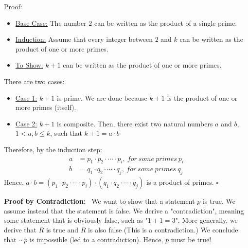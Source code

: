 \documentclass[letterpaper]{article}
\begin{document}
    \underline{Proof}:
    \begin{itemize}
        \item[] \underline{Base Case:} The number $2$ can be written as the product of a single prime.
        \item[] \underline{Induction:} Assume that every integer between $2$ and $k$ can be written as the product of one or more primes.
        \item[] \underline{To Show:} $k+1$ can be written as the product of one or more primes.
    \end{itemize}
    There are two cases:
    \begin{itemize}
        \item[] \underline{Case 1:} $k+1$ is prime. We are done because $k+1$ is the product of one or more primes (itself).
        \item[] \underline{Case 2:} $k+1$ is composite. Then, there exist two natural numbers $a$ and $b$, $1<a, b \le k$, such that $k+1 = a \cdot b$
    \end{itemize}
    Therefore, by the induction step:
    \begin{align*}
        a &= p_1 \cdot p_2 \cdot \dotsb \cdot p_i,\ for\ some\ primes\ p_i\\
        b &= q_1 \cdot q_2 \cdot \dotsb \cdot q_j,\ for\ some\ primes\ q_j
    \end{align*}
Hence, $a\cdot b = (p_1 \cdot p_2 \cdot \dotsb \cdot p_i)\cdot (q_1 \cdot q_2 \cdot \dotsb \cdot q_j)$ is a product of primes. $\square$
\setlength{\parskip}{.3in}



\noindent \textbf{Proof by Contradiction:}~ We want to show that a statement $p$ is true. We assume instead that the statement is false. We derive a "contradiction", meaning some statement that is obviously false, such as "$1+1=3$". More generally, we derive that $R$ is true and $R$ is also false (This is a contradiction.) We conclude that $\sim p$ is impossible (led to a contradiction). Hence, $p$ must be true!
\end{document}

